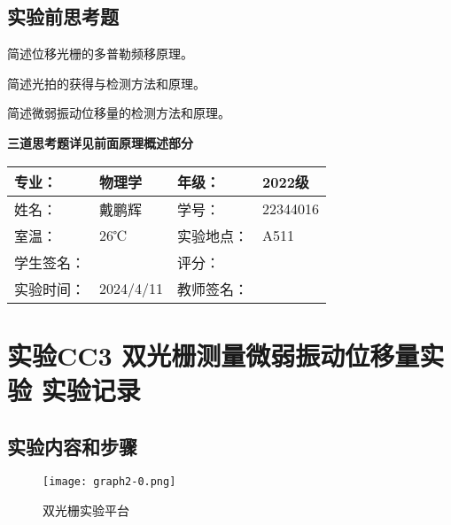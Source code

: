 \documentclass[dvipsnames, svgnames,a4paper,11pt]{article}
\begin{document}
\subsection{实验前思考题}
\begin{question}
	简述位移光栅的多普勒频移原理。
\end{question}



\begin{question}
	简述光拍的获得与检测方法和原理。
\end{question}
	

\begin{question}
	简述微弱振动位移量的检测方法和原理。
\end{question}

\textbf{三道思考题详见前面原理概述部分}

\clearpage
\begin{table}
	\renewcommand\arraystretch{1.7}
	\centering
	\begin{tabularx}{\textwidth}{|X|X|X|X|}
	\hline
	专业：& 物理学 &年级：& 2022级 \\
	\hline
	姓名：& 戴鹏辉 & 学号：& 22344016 \\
	\hline
	室温：& 26℃ & 实验地点： & A511 \\
	\hline
	学生签名：& & 评分： &\\
	\hline
	实验时间：& 2024/4/11 & 教师签名：&\\
	\hline
	\end{tabularx}
\end{table}

\section{实验CC3 \quad 双光栅测量微弱振动位移量实验 \quad\heiti 实验记录}
\subsection{实验内容和步骤}

	\begin{figure}[htbp]
		\centering
		{\texttt{[image: graph2-0.png]}\label{fig:graph2-0}}
		\quad

		\caption{双光栅实验平台}
	\end{figure}
\end{document}
